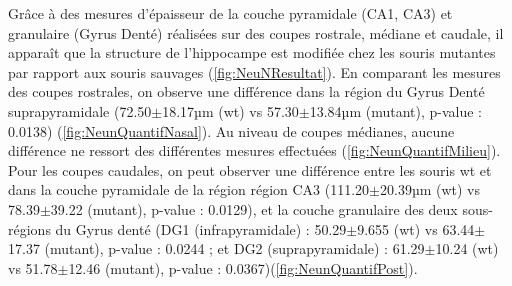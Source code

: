 		Grâce à des mesures d'épaisseur de la couche pyramidale (CA1, CA3) et granulaire (Gyrus Denté) réalisées sur des coupes rostrale, médiane et caudale, il apparaît que la structure de l'hippocampe est modifiée chez les souris mutantes par rapport aux souris sauvages (\cref{fig:NeuNResultat}). En comparant les mesures des coupes rostrales, on observe une différence dans la région du Gyrus Denté suprapyramidale (72.50$\pm$18.17µm (\acrshort{wt}) vs 57.30$\pm$13.84µm (mutant), p-value : 0.0138) (\cref{fig:NeunQuantifNasal}).  Au niveau de coupes médianes, aucune différence ne ressort des différentes mesures effectuées (\cref{fig:NeunQuantifMilieu}). Pour les coupes caudales, on peut observer une différence entre les souris \gls{wt} et \mcrd dans la couche pyramidale de la région région CA3 (111.20$\pm$20.39µm (\acrshort{wt}) vs 78.39$\pm$39.22 (mutant), p-value : 0.0129), et la couche granulaire des deux sous-régions du Gyrus denté (DG1 (infrapyramidale) : 50.29$\pm$9.655 (\acrshort{wt}) vs 63.44$\pm$17.37 (mutant), p-value : 0.0244 ; et DG2 (suprapyramidale) : 61.29$\pm$10.24 (\acrshort{wt}) vs 51.78$\pm$12.46 (mutant), p-value : 0.0367)(\cref{fig:NeunQuantifPost}).
		
